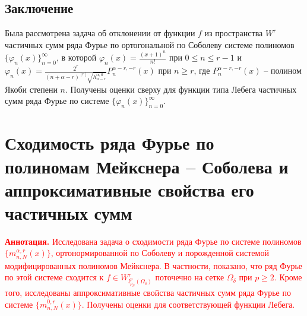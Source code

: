 \subsection{Заключение}
Была рассмотрена задача об отклонении от функции $f$ из пространства $W^r$ частичных сумм ряда Фурье по ортогональной по Соболеву системе полиномов $\{\varphi_n(x)\}_{n=0}^\infty$, в которой $\varphi_n(x)=\frac{(x+1)^n}{n!}$ при $0\le n\le r-1$ и $\varphi_n(x)=\frac{2^r}{(n+\alpha-r)^{[r]}\sqrt{h_{n-r}^{\alpha,0}}}P_n^{\alpha-r,-r}(x)$ при $n\ge r$, где $P_n^{\alpha-r,-r}(x)$ -- полином Якоби степени $n$. Получены оценки сверху для функции типа Лебега частичных сумм ряда Фурье по системе $\{\varphi_n(x)\}_{n=0}^\infty$.


\section{Сходимость ряда Фурье по полиномам Мейкснера -- Соболева и аппроксимативные свойства его частичных сумм}\label{Ram-Mex}

\textcolor{red}{\textbf{ Аннотация.} Исследована задача о сходимости ряда Фурье по системе полиномов $\{m_{n,N}^{\alpha,r}(x)\}$, ортонормированной по Соболеву и порожденной системой модифицированных полиномов Мейкснера. В частности, показано, что ряд Фурье по этой системе сходится к $f\in W^r_{l^p_{\rho_N}(\Omega_\delta)}$ поточечно на сетке $\Omega_\delta$ при $p\ge2$. Кроме того, исследованы аппроксимативные свойства частичных сумм ряда Фурье по системе $\{m_{n,N}^{0,r}(x)\}$. Получены оценки для соответствующей функции Лебега.}

